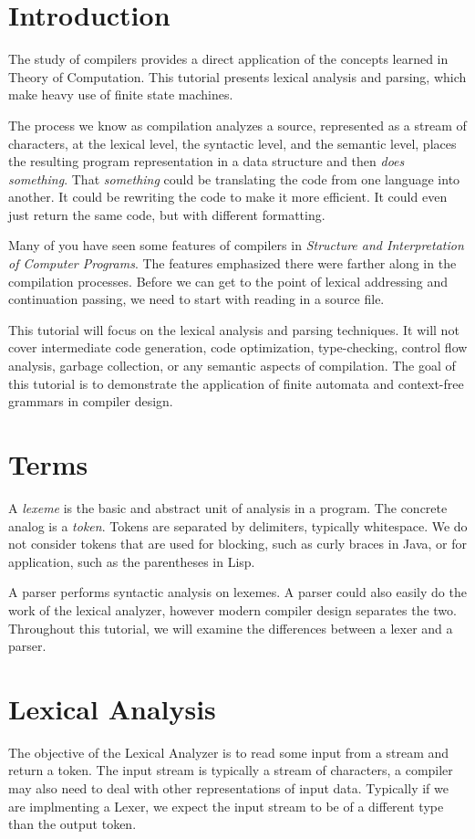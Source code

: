 \documentclass[a4paper, 10pt]{article}
\begin{document}
\section{Introduction}
The study of compilers provides a direct application of the concepts learned in Theory of Computation. This tutorial presents lexical analysis and parsing, which make heavy use of finite state machines. 

The process we know as compilation analyzes a source, represented as a stream of characters, at the lexical level, the syntactic level, and the semantic level, places the resulting program representation in a data structure and then \emph{does something}. That \emph{something} could be translating the code from one language into another. It could be rewriting the code to make it more efficient. It could even just return the same code, but with different formatting. 

Many of you have seen some features of compilers in \emph{Structure and Interpretation of Computer Programs}. The features emphasized there were farther along in the compilation processes. Before we can get to the point of lexical addressing and continuation passing, we need to start with reading in a source file. 

This tutorial will focus on the lexical analysis and parsing techniques. It will not cover intermediate code generation, code optimization, type-checking, control flow analysis, garbage collection, or any semantic aspects of compilation. The goal of this tutorial is to demonstrate the application of finite automata and context-free grammars in compiler design.

\section{Terms}
A \emph{lexeme} is the basic and abstract unit of analysis in a program. The concrete analog is a \emph{token}. Tokens are separated by delimiters, typically whitespace. We do not consider tokens that are used for blocking, such as curly braces in Java, or for application, such as the parentheses in Lisp.

A parser performs syntactic analysis on lexemes. A parser could also easily do the work of the lexical analyzer, however modern compiler design separates the two. Throughout this tutorial, we will examine the differences between a lexer and a parser.

\section{Lexical Analysis}
The objective of the Lexical Analyzer is to read some input from a stream and return a token. The input stream is typically a stream of characters, a compiler may also need to deal with other representations of input data. Typically if we are implmenting a Lexer, we expect the input stream to be of a different type than the output token. 
\end{document}
